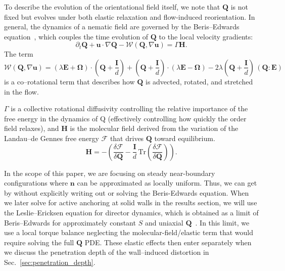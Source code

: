 \documentclass[11pt]{article}
\begin{document}
To describe the evolution of the orientational field itself, we note that $\mathbf{Q}$ is not fixed but evolves under both elastic relaxation and flow-induced reorientation. In general, the dynamics of a nematic field are governed by the Beris–Edwards equation~\cite{beris1994thermodynamics}, which couples the time evolution of $\mathbf{Q}$ to the local velocity gradients:
\begin{equation}
\partial_t \mathbf{Q} + \mathbf{u}\!\cdot\!\nabla \mathbf{Q} - \mathcal{W}(\mathbf{Q},\nabla\mathbf{u})
= \Gamma\mathbf{H}.
\label{eq:Beris-Edwards}
\end{equation}
The term 
\begin{equation}
    \mathcal{W}(\mathbf{Q},\nabla\mathbf{u}) = (\lambda \mathbf{E} + \boldsymbol{\Omega}) \cdot \left(\mathbf{Q} + \frac{\mathbf{I}}{d}\right) + \left(\mathbf{Q} + \frac{\mathbf{I}}{d}\right) \cdot (\lambda \mathbf{E} - \boldsymbol{\Omega}) - 2\lambda \left(\mathbf{Q} + \frac{\mathbf{I}}{d}\right)\,(\mathbf{Q}:\mathbf{E})
    \label{eq:co--rotation}
\end{equation}
is a co--rotational term that describes how $\mathbf{Q}$ is advected, rotated, and stretched in the flow.

$\Gamma$ is a collective rotational diffusivity controlling the relative importance of the free energy in the dynamics of Q (effectively controlling how quickly the order field relaxes), and $\mathbf{H}$ is the molecular field derived from the variation of the Landau--de Gennes free energy $\mathcal{F}$ that drives $\mathbf{Q}$ toward equilibrium. 
\begin{equation}
\mathbf{H}
= -\left(\frac{\delta \mathcal{F}}{\delta \mathbf{Q}}
- \frac{\mathbf{I}}{d}\,\mathrm{Tr}\!\left(\frac{\delta \mathcal{F}}{\delta \mathbf{Q}}\right)\right).
\end{equation}

In the scope of this paper, we are focusing on steady near-boundary configurations where $\mathbf{n}$ can be approximated as locally uniform. Thus, we can get by without explicitly writing out or solving the Beris-Edwards equation. When we later solve for active anchoring at solid walls in the results section, we will use the Leslie--Ericksen equation for director dynamics, which is obtained as a limit of Beris--Edwards for approximately constant $S$ and uniaxial $\mathbf{Q}$~\cite{degennes1993physics, leslie1968some}. In this limit, we use a local torque balance neglecting the molecular-field/elastic term that would require solving the full $\mathbf{Q}$ PDE. These elastic effects then enter separately when we discuss the penetration depth of the wall--induced distortion in Sec.~\ref{sec:penetration_depth}.
\end{document}
